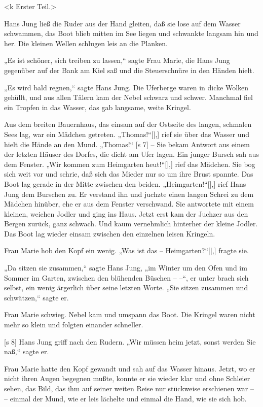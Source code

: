 <k Erster Teil.>


Hans Jung ließ die Ruder aus der Hand gleiten,
daß sie lose auf dem Wasser schwammen, das
Boot blieb mitten im See liegen und schwankte langsam
hin und her. Die kleinen Wellen schlugen leis an
die Planken.

„Es ist schöner, sich treiben zu lassen,“ sagte
Frau Marie, die Hans Jung gegenüber auf der Bank
am Kiel saß und die Steuerschnüre in den Händen
hielt.

„Es wird bald regnen,“ sagte Hans Jung. Die
Uferberge waren in dicke Wolken gehüllt, und aus
allen Tälern kam der Nebel schwarz und schwer.
Manchmal fiel ein Tropfen in das Wasser, das gab
langsame, weite Kringel.

Aus dem breiten Bauernhaus, das einsam auf
der Ostseite des langen, schmalen Sees lag, war ein
Mädchen getreten. „Thomas!“[|,] rief sie über das
Wasser und hielt die Hände an den Mund. „Thomas!“
[s 7]
– Sie bekam Antwort aus einem der letzten Häuser
des Dorfes, die dicht am Ufer lagen. Ein junger
Bursch sah aus dem Fenster. „Wir kommen zum
Heimgarten heut!“[|,] rief das Mädchen. Sie bog sich
weit vor und schrie, daß sich das Mieder nur so um
ihre Brust spannte. Das Boot lag gerade in der
Mitte zwischen den beiden. „Heimgarten!“[|,] rief Hans
Jung dem Burschen zu. Er verstand ihn und juchzte
einen langen Schrei zu dem Mädchen hinüber, ehe
er aus dem Fenster verschwand. Sie antwortete mit
einem kleinen, weichen Jodler und ging ins Haus.
Jetzt erst kam der Juchzer aus den Bergen zurück,
ganz schwach. Und kaum vernehmlich hinterher der
kleine Jodler. Das Boot lag wieder einsam zwischen
den einzelnen leisen Kringeln.

Frau Marie hob den Kopf ein wenig. „Was
ist das – Heim­garten?“[|,] fragte sie.

„Da sitzen sie zusammen,“ sagte Hans Jung,
„im Winter um den Ofen und im Sommer im Garten,
zwischen den blühenden Büschen – –“, er unter­
brach sich selbst, ein wenig ärgerlich über seine
letzten Worte. „Sie sitzen zusammen und schwätzen,“
sagte er.

Frau Marie schwieg. Nebel kam und umspann
das Boot. Die Kringel waren nicht mehr so klein
und folgten einander schneller.

[s 8]
Hans Jung griff nach den Rudern. „Wir müssen
heim jetzt, sonst werden Sie naß,“ sagte er.

Frau Marie hatte den Kopf gewandt und sah
auf das Wasser hinaus. Jetzt, wo er nicht ihren
Augen begegnen mußte, konnte er sie wieder klar
und ohne Schleier sehen, das Bild, das ihm auf seiner
weiten Reise nur stückweise erschienen war – –
einmal der Mund, wie er leis lächelte und einmal
die Hand, wie sie sich hob.

